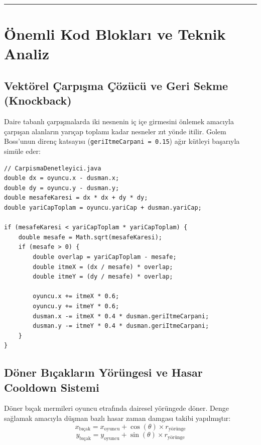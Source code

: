 \documentclass[12pt]{article}
\begin{document}
\bigskip
\hrule
\bigskip

\section{Önemli Kod Blokları ve Teknik Analiz}

\subsection{Vektörel Çarpışma Çözücü ve Geri Sekme (Knockback)}
Daire tabanlı çarpışmalarda iki nesnenin iç içe girmesini önlemek amacıyla çarpışan alanların yarıçap toplamı kadar nesneler zıt yönde itilir. Golem Boss'unun direnç katsayısı (\texttt{geriItmeCarpani = 0.15}) ağır kütleyi başarıyla simüle eder:

\begin{lstlisting}[caption={Vektörel Çarpışma Çözücü}, label={list:carpismafizik}]
// CarpismaDenetleyici.java
double dx = oyuncu.x - dusman.x;
double dy = oyuncu.y - dusman.y;
double mesafeKaresi = dx * dx + dy * dy;
double yariCapToplam = oyuncu.yariCap + dusman.yariCap;

if (mesafeKaresi < yariCapToplam * yariCapToplam) {
    double mesafe = Math.sqrt(mesafeKaresi);
    if (mesafe > 0) {
        double overlap = yariCapToplam - mesafe;
        double itmeX = (dx / mesafe) * overlap;
        double itmeY = (dy / mesafe) * overlap;
        
        oyuncu.x += itmeX * 0.6;
        oyuncu.y += itmeY * 0.6;
        dusman.x -= itmeX * 0.4 * dusman.geriItmeCarpani;
        dusman.y -= itmeY * 0.4 * dusman.geriItmeCarpani;
    }
}
\end{lstlisting}

\subsection{Döner Bıçakların Yörüngesi ve Hasar Cooldown Sistemi}
Döner bıçak mermileri oyuncu etrafında dairesel yörüngede döner. Denge sağlamak amacıyla düşman bazlı hasar zaman damgası takibi yapılmıştır:
\begin{equation}
    x_{\text{bıçak}} = x_{\text{oyuncu}} + \cos(\theta) \times r_{\text{yörünge}}
\end{equation}
\begin{equation}
    y_{\text{bıçak}} = y_{\text{oyuncu}} + \sin(\theta) \times r_{\text{yörünge}}
\end{equation}
\end{document}
